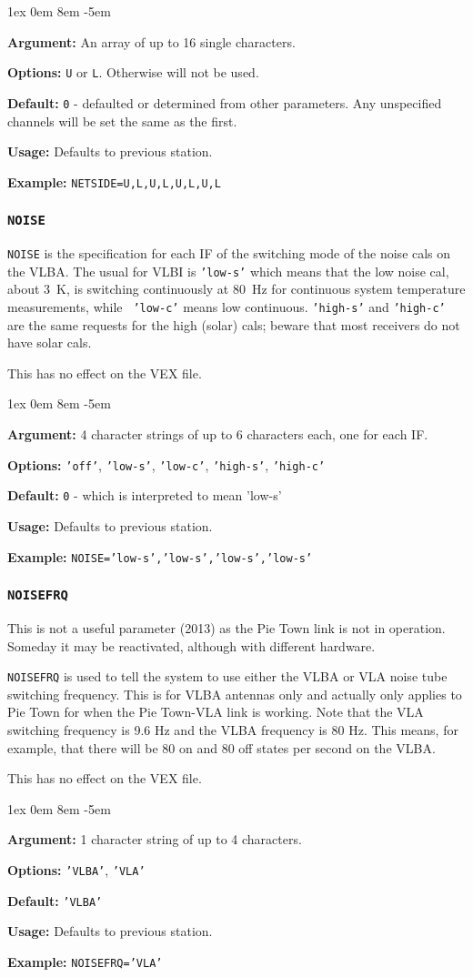 \documentclass{report}
\newcommand{\rcwbox}[5]{
  \begin{list}{}{\parsep 1ex  \itemsep 0em
                 \leftmargin 8em  \itemindent -5em }
    \item {\bf Argument:} #1
    \item {\bf Options:}  #2
    \item {\bf Default:}  #3
    \item {\bf Usage:}    #4
    \item {\bf Example:}  #5
  \end{list}
}
\begin{document}
\rcwbox
{An array of up to 16 single characters.}
{{\tt U} or {\tt L}. Otherwise will not be used.}
{{\tt 0} - defaulted or determined from other parameters.  Any
unspecified channels will be set the same as the first.}
{Defaults to previous station.}
{{\tt NETSIDE=U,L,U,L,U,L,U,L}}



\subsubsection{\label{SP:NOISE}{\tt NOISE}}

{\tt NOISE} is the specification for each IF of the switching mode of
the noise cals on the VLBA. The usual for VLBI is {\tt 'low-s'} which
means that the low noise cal, about 3~K, is switching continuously at
80~Hz for continuous system temperature measurements, while {\tt
'low-c'} means low continuous. {\tt 'high-s'} and {\tt 'high-c'} are
the same requests for the high (solar) cals; beware that most
receivers do not have solar cals.

This has no effect on the VEX file.

\rcwbox
{4 character strings of up to 6 characters each, one for each IF.}
{{\tt 'off'}, {\tt 'low-s'}, {\tt 'low-c'}, {\tt 'high-s'},
{\tt 'high-c'}}
{{\tt 0} - which is interpreted to mean 'low-s'}
{Defaults to previous station.}
{{\tt NOISE='low-s','low-s','low-s','low-s'}}

\subsubsection{\label{SP:NOISEFRQ}{\tt NOISEFRQ}}

This is not a useful parameter (2013) as the Pie Town link is
not in operation.  Someday it may be reactivated, although with
different hardware.

{\tt NOISEFRQ} is used to tell the system to use either the VLBA or
VLA noise tube switching frequency.  This is for VLBA antennas only
and actually only applies to Pie Town for when the Pie Town-VLA link
is working.  Note that the VLA switching frequency is 9.6 Hz and the
VLBA frequency is 80 Hz.  This means, for example, that there will be
80 on and 80 off states per second on the VLBA.

This has no effect on the VEX file.

\rcwbox
{1 character string of up to 4 characters.}
{{\tt 'VLBA'}, {\tt 'VLA'}}
{{\tt 'VLBA'}}
{Defaults to previous station.}
{{\tt NOISEFRQ='VLA'}}
\end{document}
